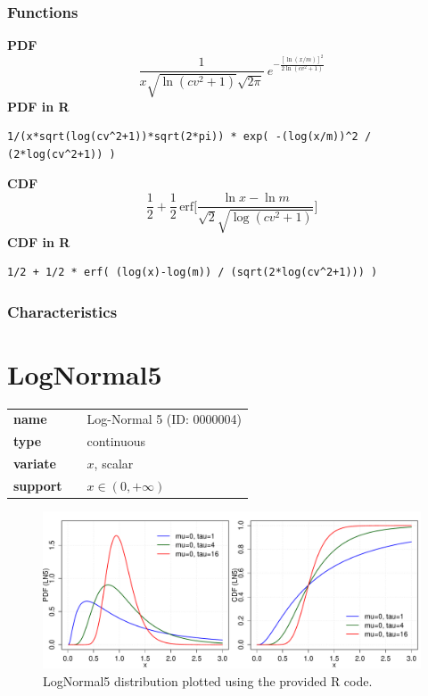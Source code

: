 \subsubsection*{Functions}

\smallskip \noindent \hspace{.2cm} \textbf{PDF} 
\begin{equation*}\frac{1}{x\sqrt{\ln(cv^2+1)}\sqrt{2\pi}}\ e^{-\frac{\left[\ln (x/m)\right]^2}{2\ln(cv^2+1)}}\end{equation*}
\smallskip \noindent \hspace{.2cm} \textbf{PDF in R}  
\begin{verbatim}1/(x*sqrt(log(cv^2+1))*sqrt(2*pi)) * exp( -(log(x/m))^2 / (2*log(cv^2+1)) )\end{verbatim}
\smallskip \noindent \hspace{.2cm} \textbf{CDF} 
\begin{equation*}\frac12 + \frac12\,\text{erf}\Big[\frac{\ln x-\ln m}{\sqrt{2}\sqrt{\log(cv^2+1)}}\Big]\end{equation*}
\smallskip \noindent \hspace{.2cm} \textbf{CDF in R} 
\begin{verbatim}1/2 + 1/2 * erf( (log(x)-log(m)) / (sqrt(2*log(cv^2+1))) )\end{verbatim}
\smallskip
\subsubsection*{Characteristics}
\smallskip
\section*{LogNormal5} 

  \bigskip 

\begin{tabular}{p{2cm}cl}
\textbf{name} & & Log-Normal 5 (ID: 0000004)\\ 
 
\textbf{type} & & continuous \\ 

\textbf{variate} & & $x$, scalar \\ 

\textbf{support} & & $x \in (0,+\infty)$
\end{tabular}

\begin{figure}[ht!]
\centering
  \includegraphics[width=140mm]{pics/LogNormal5.pdf}
 \caption{LogNormal5 distribution plotted using the provided R code.}
 \label{fig:LogNormal5}
\end{figure}

